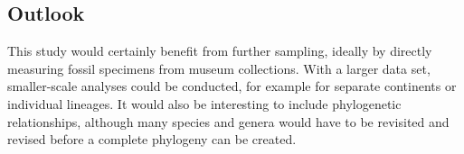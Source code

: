 \subsection{Outlook}
This study would certainly benefit from further sampling, ideally by directly measuring fossil specimens from museum collections.
With a larger data set, smaller-scale analyses could be conducted, for example for separate continents or individual lineages.
It would also be interesting to include phylogenetic relationships, although many species and genera would have to be revisited and revised before a complete phylogeny can be created.
















